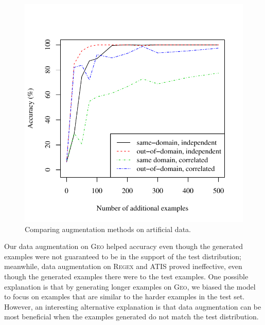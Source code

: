 \documentclass[11pt,letterpaper]{article}
\newcommand{\atis}{\textsc{ATIS}\xspace}
\newcommand{\regex}{\textsc{Regex}\xspace}
\newcommand{\geo}{\textsc{Geo}\xspace}
\begin{document}
\begin{figure}[t] 
\small
\begin{center} 
  \includegraphics[scale=0.65]{fig-artificial-aug.pdf}
\end{center} 
\caption{Comparing augmentation methods on artificial data.}
\label{fig:artificial}
\end{figure}

Our data augmentation on \geo helped accuracy
even though the generated examples were not guaranteed
to be in the support of the test distribution;
meanwhile, data augmentation on \regex and \atis
proved ineffective, even though 
the generated examples there were to the test examples. 
One possible explanation is that by generating longer examples on
\geo, we biased the model to focus on examples that are similar to the
harder examples in the test set.
However, an interesting alternative explanation is that
data augmentation can be most beneficial when the examples generated
do not match the test distribution.
\end{document}
